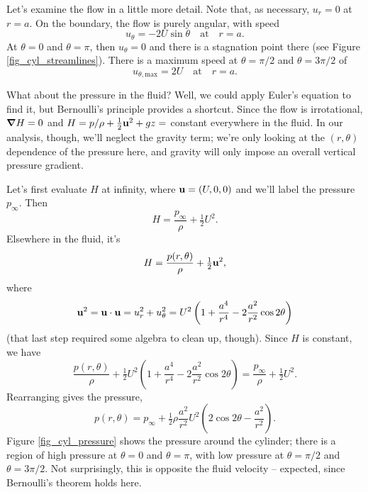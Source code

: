 Let's examine the flow in a little more detail.  Note that, as necessary, $u_r=0$ at $r=a$.  On the boundary, the flow is purely angular, with speed 
\[
u_\theta = -2U \sin \theta \quad \text{at} \quad r=a.
\]
At $\theta = 0$ and $\theta = \pi$, then $u_\theta = 0$ and there is a stagnation point there (see Figure \ref{fig_cyl_streamlines}).  There is a maximum speed at $\theta = \pi/2$ and $\theta = 3\pi/2$ of
\[
u_{\theta, \text{max}} = 2U \quad \text{at} \quad r=a.
\]

What about the pressure in the fluid?  Well, we could apply Euler's equation to find it, but Bernoulli's principle provides a shortcut.  Since the flow is irrotational, $\boldsymbol{\nabla} H = 0$ and $H = p/\rho + \tfrac{1}{2} \mathbf{u}^2 + gz = $ constant everywhere in the fluid.  In our analysis, though, we'll neglect the gravity term; we're only looking at the $(r, \theta)$ dependence of the pressure here, and gravity will only impose an overall vertical pressure gradient.

Let's first evaluate $H$ at infinity, where $\mathbf{u} = (U,0,0)$ and we'll label the pressure $p_\infty$.  Then
\[
H = \frac{p_\infty}{\rho} + \tfrac{1}{2} U^2.
\]
Elsewhere in the fluid, it's
\[
H = \frac{p(r, \theta)}{\rho} + \tfrac{1}{2} \mathbf{u}^2,
\]
where
\[
\mathbf{u}^2 = \mathbf{u} \cdot \mathbf{u} = u_r^2 + u_\theta^2 = U^2 \left( 1 + \frac{a^4}{r^4} - 2\frac{a^2}{r^2} \cos 2\theta \right)
\]
(that last step required some algebra to clean up, though).  Since $H$ is constant, we have
\[
\frac{p(r, \theta)}{\rho} + \tfrac{1}{2} U^2 \left( 1 + \frac{a^4}{r^4} - 2\frac{a^2}{r^2} \cos 2\theta \right) = \frac{p_\infty}{\rho} + \tfrac{1}{2} U^2.
\]
Rearranging gives the pressure,
\begin{equation}
p(r, \theta) = p_\infty + \tfrac{1}{2} \rho \frac{a^2}{r^2} U^2 \left( 2 \cos 2\theta - \frac{a^2}{r^2} \right).
\end{equation}
Figure \ref{fig_cyl_pressure} shows the pressure around the cylinder; there is a region of high pressure at $\theta = 0$ and $\theta = \pi$, with low pressure at $\theta = \pi/2$ and $\theta = 3\pi/2$.  Not surprisingly, this is opposite the fluid velocity -- expected, since Bernoulli's theorem holds here.

